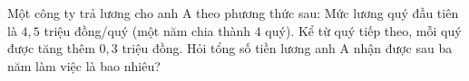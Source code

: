 \begin{ex}
Một công ty trả lương cho anh A theo phương thức sau: Mức lương quý đầu tiên là $4{,}5$ triệu đồng/quý (một năm chia thành $4$ quý). Kể từ quý tiếp theo, mỗi quý được tăng thêm $0{,}3$ triệu đồng. Hỏi tổng số tiền lương anh A nhận được sau ba năm làm việc là bao nhiêu?
\end{ex}
